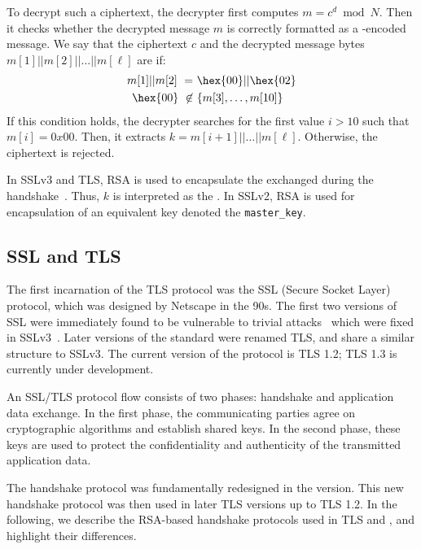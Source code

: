 To decrypt such a ciphertext, the decrypter first computes $m = c^d
\bmod N$.  Then it checks whether the decrypted message $m$ is
correctly formatted as a \PKCS-encoded message. We say that the
ciphertext $c$ and the decrypted message bytes $m{[1]} || m{[2]} || ... ||
m{[\ell]}$ are \PKCSconform if:
\begin{equation*} 
	\begin{split} 
		m{[1]}||m{[2]} \text{ } = &\text{ } \hex{00} || \hex{02}\\
		\hex{00} \text{ } \not \in &\text{ } \{m{[3]}, \ldots,m{[10]}\}\\ 
	\end{split}
\end{equation*} 
If this condition holds, the decrypter searches for the first value
$i>10$ such that $m{[i]}=0x00$. Then, it extracts $k =
m{[i+1]}||\ldots||m{[\ell]}$. Otherwise, the ciphertext is rejected.

In SSLv3 and TLS, RSA \PKCS is used to encapsulate the
\pms exchanged during the
handshake~\cite{rfc5246}. Thus, $k$ is interpreted as the
\pms.  In SSLv2, RSA \PKCS is used for
encapsulation of an equivalent key denoted the \texttt{master\_key}.


\subsection{SSL and TLS}
The first incarnation of the TLS protocol was the SSL (Secure Socket
Layer) protocol, which was designed by Netscape in the 90s. The first two
versions of SSL were immediately found to be vulnerable to trivial
attacks~\cite{ProhibitingSSLv2,WagnerSchneier:SSLAnalysis:96} which 
were fixed in SSLv3~\cite{SSLv3}.  Later versions of
the standard were renamed TLS, and share a similar structure to SSLv3.
The current version of the protocol is TLS 1.2; TLS 1.3 is currently
under development.

An SSL/TLS protocol flow consists of two phases: handshake and
application data exchange. In the first phase, the communicating
parties agree on cryptographic algorithms and establish shared
keys. In the second phase, these keys are used to protect the
confidentiality and authenticity of the transmitted application data.

The handshake protocol was fundamentally redesigned in the \sslthree
version. This new handshake protocol was then used in later TLS
versions up to TLS 1.2. In the following, we describe the RSA-based
handshake protocols used in TLS and \ssltwo, and highlight their
differences.

